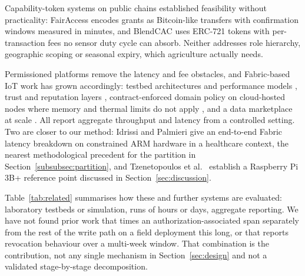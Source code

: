 \documentclass[a4paper,fleqn]{cas-sc}
\begin{document}
Capability-token systems on public chains established feasibility without
practicality: FairAccess \cite{ouaddah2016fairaccess} encodes grants as
Bitcoin-like transfers with confirmation windows measured in minutes, and
BlendCAC \cite{xu2018blendcac} uses ERC-721 tokens with per-transaction fees
no sensor duty cycle can absorb. Neither addresses role hierarchy,
geographic scoping or seasonal expiry, which agriculture actually needs.

Permissioned platforms remove the latency and fee obstacles, and Fabric-based
IoT work has grown accordingly: testbed architectures and performance models
\cite{shih2022iiot,pajooh2022fabric_iot,kepark2023fabric_model}, trust and
reputation layers \cite{putra2021trust}, contract-enforced domain policy on
cloud-hosted nodes where memory and thermal limits do not apply
\cite{usman2024blockchain}, and a data marketplace at scale
\cite{gonzalez2023marketplace}. All report aggregate throughput and latency
from a controlled setting. Two are closer to our method: Idrissi and
Palmieri \cite{idrissi2024blockchain_jsupercomput} give an end-to-end Fabric
latency breakdown on constrained ARM hardware in a healthcare context, the
nearest methodological precedent for the partition in
Section~\ref{subsubsec:partition}, and Tzenetopoulos et
al.\ \cite{tzenetopoulos2022hlfkubed} establish a Raspberry Pi 3B+ reference
point discussed in Section~\ref{sec:discussion}.

Table~\ref{tab:related} summarises how these and further systems
\cite{zaidi2023fabrication,bandara2021modeling} are evaluated: laboratory
testbeds or simulation, runs of hours or days, aggregate reporting. We have
not found prior work that times an authorization-associated span separately
from the rest of the write path on a field deployment this long, or that
reports revocation behaviour over a multi-week window. That combination is
the contribution, not any single mechanism in Section~\ref{sec:design} and
not a validated stage-by-stage decomposition.
\end{document}
